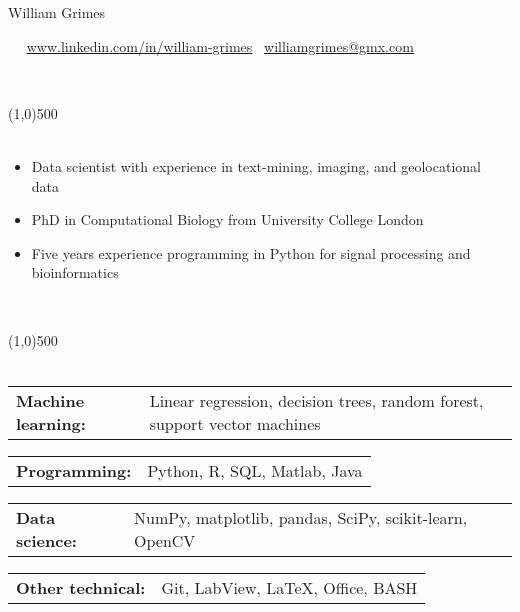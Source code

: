 \documentclass[11pt]{res}
\begin{document}
\centerline{{\Huge William Grimes}}
\vspace{-0.7em}


\Mobilefone \ \textcolor{mygray}{                \hfill}
\ComputerMouse \ \url{www.linkedin.com/in/william-grimes} \hfill 
\Letter \ \href{mailto:williamgrimes@gmx.com}{williamgrimes@gmx.com}

\vspace{-1.0em}
\begin{flushleft}
\\
\end{flushleft}
\vspace{-3.2em}

\line(1,0){500}\\\smallskip
\vspace*{-0.8cm}
\nolinebreak\\
\begin{itemize} %
	\item Data scientist with experience in text-mining, imaging, and geolocational data
	\item PhD in Computational Biology from University College London 
	\item Five years experience programming in Python for signal processing and bioinformatics
\end{itemize}

\vspace{-1.2em}
\begin{flushleft}
\\
\end{flushleft}
\vspace{-3.2em}
\line(1,0){500}\\
\vspace*{-0.3cm}
\nolinebreak\\
\begin{tabular}{@{} p{3.3cm} p{14.0cm} @{}} {\bf Machine learning:} & \textcolor{mygray}{Linear regression, decision trees, random forest, support vector machines} \end{tabular}
\begin{tabular}{@{} p{3.3cm} p{14.0cm} @{}} {\bf Programming:} & \textcolor{mygray}{Python, R, SQL, Matlab, Java}\end{tabular}
\begin{tabular}{@{} p{3.3cm} p{14.0cm} @{}} {\bf Data science:} & \textcolor{mygray}{NumPy, matplotlib, pandas, SciPy, scikit-learn, OpenCV }\end{tabular}
\begin{tabular}{@{} p{3.3cm} p{14.0cm} @{}} {\bf Other technical:} & \textcolor{mygray}{ Git, LabView, \LaTeX, Office, BASH} \end{tabular}
\end{document}
